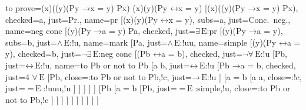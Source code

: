 \documentclass[10pt,british,a4paper,doc2]{ltxdoc}
\newcommand*{\lif}{\ensuremath{\mathbin{\rightarrow}}}
\newcommand*{\liff}{\ensuremath{\mathbin{\leftrightarrow}}}
\newcommand*{\elim}{\,\text{E}}
\begin{document}
\begin{tableau}
  {
    to prove={(\exists x)((\forall y)(Py \lif x = y) \land Px) \sststile{}{} (\exists x)(\forall y)(Py \liff x = y)}
  }
  [{(\exists x)((\forall y)(Py \lif x = y) \land Px)}, checked=a, just=Pr., name=pr
    [{\lnot (\exists x)(\forall y)(Py \liff x = y)}, subs=a, just=Conc.~neg., name=neg conc
      [{(\forall y)(Py \lif a = y) \land Pa}, checked, just=$\exists\elim$:pr
        [{(\forall y)(Py \lif a = y)}, subs=b, just=$\land\elim$:!u, name=mark
          [Pa, just=$\land\elim$:!uu, name=simple
            [{\lnot (\forall y)(Py \liff a = y)}, checked=b, just=$\lnot\exists\elim$:neg conc
              [{\lnot (Pb \liff a = b)}, checked, just=$\lnot\forall\elim$:!u
                [Pb, just=$\liff\elim$:!u, name=to Pb or not to Pb
                  [a \neq b, just=$\liff\elim$:!u
                  [{Pb \lif a = b}, checked, just=4 $\forall\elim$
                      [\lnot Pb, close={:to Pb or not to Pb,!c}, just=$\lif\elim$:!u
                      ]
                      [{a = b}
                        [a \neq a, close={:!c}, just={$=\elim$:{!uuu,!u}}
                        ]
                      ]
                  ]
                ]
                ]
                [\lnot Pb
                  [{a = b}
                    [Pb, just={$=\elim$:{simple,!u}}, close={:to Pb or not to Pb,!c}
                    ]
                  ]
                ]
              ]
            ]
          ]
        ]
      ]
    ]
  ]
\end{tableau}
\end{document}
